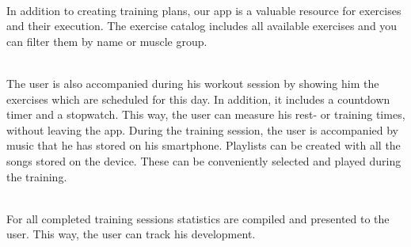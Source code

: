 \documentclass[FIPLY_base.tex]{subfiles}
\begin{document}
\ \\
In addition to creating training plans, our app is a valuable resource for exercises and their execution.
The exercise catalog includes all available exercises and you can filter them by name or muscle group.

\ \\
The user is also accompanied during his workout session by showing him the exercises which are scheduled for this day. In addition, it includes a countdown timer and a stopwatch. This way, the user can measure his rest- or training times, without leaving the app.
During the training session, the user is accompanied by music that he has stored on his smartphone.
Playlists can be created with all the songs stored on the device. These can be conveniently selected and played during the training.

\ \\
For all completed training sessions statistics are compiled and presented to the user.
This way, the user can track his development.
\end{document}

